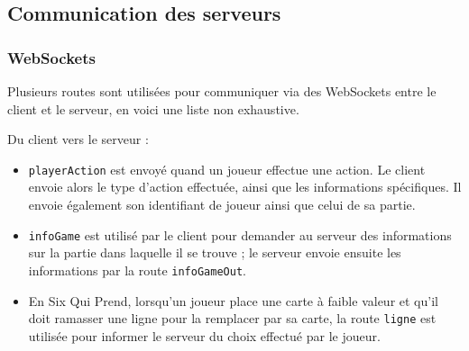 \documentclass[a4paper]{article}
\begin{document}
\subsection{Communication des serveurs} 
\subsubsection{WebSockets}
Plusieurs routes sont utilisées pour communiquer via des WebSockets entre le client et le serveur, en voici une liste non exhaustive.

Du client vers le serveur :
\begin{itemize}
    \item \texttt{playerAction} est envoyé quand un joueur effectue une action. Le client envoie alors le type d'action effectuée, ainsi que les informations spécifiques. Il envoie également son identifiant de joueur ainsi que celui de sa partie.
    \item \texttt{infoGame} est utilisé par le client pour demander au serveur des informations sur la partie dans laquelle il se trouve ; le serveur envoie ensuite les informations par la route \texttt{infoGameOut}.
    \item En Six Qui Prend, lorsqu'un joueur place une carte à faible valeur et qu'il doit ramasser une ligne pour la remplacer par sa carte, la route \texttt{ligne} est utilisée pour informer le serveur du choix effectué par le joueur.
\end{itemize}
\end{document}
